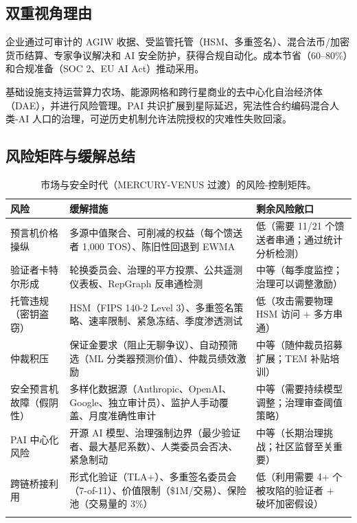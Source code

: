\documentclass[11pt]{article}
\begin{document}
\subsection{双重视角理由}
\begin{description}[style=nextline]
  \item[近期（MERCURY 时代）] 企业通过可审计的 AGIW 收据、受监管托管（HSM、多重签名）、混合法币/加密货币结算、专家争议解决和 AI 安全防护，获得合规自动化。成本节省（60--80\%）和合规准备（SOC 2、EU AI Act）推动采用。
  \item[百年尺度（VENUS 至 ANDROMEDA）] 基础设施支持运营算力农场、能源网格和跨行星商业的去中心化自治经济体（DAE），并进行风险管理。PAI 共识扩展到星际延迟，宪法性合约编码混合人类-AI 人口的治理，可逆历史机制允许法院授权的灾难性失败回滚。
\end{description}

\subsection{风险矩阵与缓解总结}
\begin{longtable}{@{}p{}p{}p{}@{}}
\toprule
\textbf{风险} & \textbf{缓解措施} & \textbf{剩余风险敞口} \\\midrule
预言机价格操纵 & 多源中值聚合、可削减的权益（每个馈送者 1,000 TOS）、陈旧性回退到 EWMA & 低（需要 11/21 个馈送者串通；通过统计分析检测） \\
验证者卡特尔形成 & 轮换委员会、治理的平方投票、公共遥测仪表板、RepGraph 反串通检测 & 中等（每季度监控；治理可以调整激励） \\
托管违规（密钥盗窃） & HSM（FIPS 140-2 Level 3）、多重签名策略、速率限制、紧急冻结、季度渗透测试 & 低（攻击需要物理 HSM 访问 + 多方串通） \\
仲裁积压 & 保证金要求（阻止无聊争议）、自动预筛选（ML 分类器预测价值）、仲裁员绩效激励 & 中等（随仲裁员招募扩展；TEM 补贴培训） \\
安全预言机故障（假阴性） & 多样化数据源（Anthropic、OpenAI、Google、独立审计员）、监护人手动覆盖、月度准确性审计 & 中等（需要持续模型调整；治理审查阈值策略） \\
PAI 中心化风险 & 开源 AI 模型、治理强制边界（最少验证者、最大基尼系数）、人类委员会否决、紧急制动 & 中等（长期治理挑战；社区监督至关重要） \\
跨链桥接利用 & 形式化验证（TLA+）、多重签名委员会（7-of-11）、价值限制（\$1M/交易）、保险池（交易量的 3\%） & 低（利用需要 4+ 个被攻陷的验证者 + 破坏加密假设） \\\bottomrule
\caption{市场与安全时代（MERCURY-VENUS 过渡）的风险-控制矩阵。}
\label{tab:risk-markets-expanded}
\end{longtable}
\end{document}
